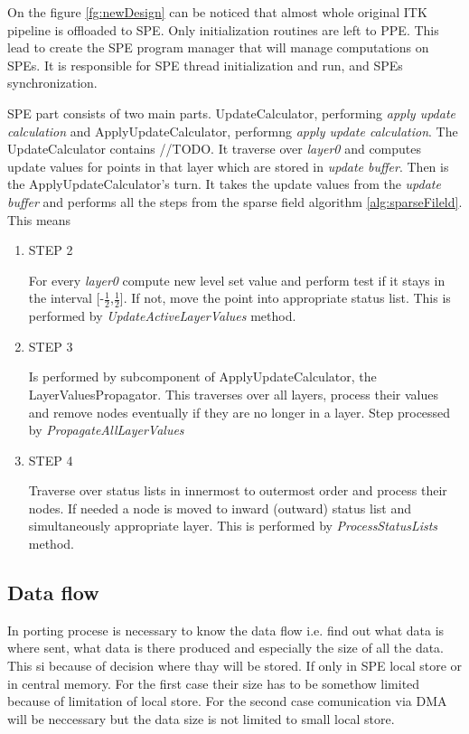 On the figure \ref{fg:newDesign} can be noticed that almost whole original ITK pipeline is offloaded to SPE. Only initialization routines are left to PPE. This lead to create the SPE program manager that will manage computations on SPEs. It is responsible for SPE thread initialization and run, and SPEs synchronization.

SPE part consists of two main parts. UpdateCalculator, performing \emph{apply
update calculation} and ApplyUpdateCalculator, performng \emph{apply update
calculation}. The UpdateCalculator contains //TODO. It traverse over
\emph{layer0} and computes update values for points in that layer which are
stored in \emph{update buffer}. Then is the ApplyUpdateCalculator's turn. It
takes the update values from the \emph{update buffer} and performs all the
steps from the sparse field algorithm \ref{alg:sparseFileld}. This means
\begin{enumerate}
\item STEP 2
\par
For every \emph{layer0} compute new level set value and perform test if
it stays in the interval [-$\frac{1}{2}$,$\frac{1}{2}$]. If not, move the point
into appropriate status list. This is performed by
\emph{UpdateActiveLayerValues} method.

\item STEP 3
\par
Is performed by subcomponent of ApplyUpdateCalculator, the
LayerValuesPropagator. This traverses over all layers, process their values and
remove nodes eventually if they are no longer in a layer. Step processed by
\emph{PropagateAllLayerValues}


\item STEP 4
\par
Traverse over status lists in innermost to outermost order and process their
nodes. If needed a node is moved to inward (outward) status list and
simultaneously appropriate layer. This is performed by \emph{ProcessStatusLists}
method.
\end{enumerate}

\subsection{Data flow}

In porting procese is necessary to know the data flow i.e. find out what data is
where sent, what data is there produced and especially the size of all the data.
This si because of decision where thay will be stored. If only in SPE local
store or in central memory. For the first case their size has to be somethow
limited because of limitation of local store. For the second case comunication
via DMA will be neccessary but the data size is not limited to small local
store.

